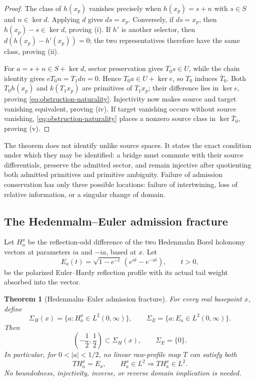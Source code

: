\documentclass[11pt]{article}
\newtheorem{theorem}{Theorem}[section]
\theoremstyle{definition}
\theoremstyle{remark}
\begin{document}
\begin{proof}
The class of \(h(x_p)\) vanishes precisely when
\(h(x_p)=s+n\) with \(s\in S\) and \(n\in\ker d\).  Applying \(d\)
gives \(ds=x_p\).  Conversely, if \(ds=x_p\), then
\(h(x_p)-s\in\ker d\), proving (i).  If \(h'\) is another selector, then
\(d(h(x_p)-h'(x_p))=0\); the two representatives therefore have the same
class, proving (ii).

For \(a=s+n\in S+\ker d\), sector preservation gives
\(T_0s\in U\), while the chain identity gives
\(eT_0n=T_1dn=0\).  Hence \(T_0a\in U+\ker e\), so \(T_0\) induces
\(\overline T_0\).  Both \(T_0h(x_p)\) and \(k(T_1x_p)\) are primitives
of \(T_1x_p\); their difference lies in \(\ker e\), proving
\eqref{eq:obstruction-naturality}.  Injectivity now makes source and target
vanishing equivalent, proving (iv).  If target vanishing occurs without
source vanishing, \eqref{eq:obstruction-naturality} places a nonzero source
class in \(\ker\overline T_0\), proving (v).
\end{proof}

The theorem does not identify unlike source spaces.  It states the exact
condition under which they may be identified: a bridge must commute with
their source differentials, preserve the admitted sector, and remain
injective after quotienting both admitted primitives and primitive
ambiguity.  Failure of admission conservation has only three possible
locations: failure of intertwining, loss of relative information, or a
singular change of domain.

\subsection{The Hedenmalm--Euler admission fracture}

Let \(H_a^x\) be the reflection-odd difference of the two Hedenmalm Borel
holonomy vectors at parameters \(ia\) and \(-ia\), based at \(x\).  Let
\[
 E_a(t)=\sqrt{1-e^{-t}}\,(e^{at}-e^{-at}),\qquad t>0,
\tag{5.G}\label{eq:weighted-euler-profile}
\]
be the polarized Euler--Hardy reflection profile with its actual tail
weight absorbed into the vector.

\begin{theorem}[Hedenmalm--Euler admission fracture]
\label{thm:hedenmalm-euler}
For every real basepoint \(x\), define
\[
 \Sigma_H(x)=\{a:H_a^x\in L^2(0,\infty)\},\qquad
 \Sigma_E=\{a:E_a\in L^2(0,\infty)\}.
\]
Then
\[
 \left(-\frac12,\frac12\right)\subset\Sigma_H(x),
 \qquad \Sigma_E=\{0\}.
\tag{5.H}\label{eq:analytic-spectra}
\]
In particular, for \(0<|a|<1/2\), no linear raw-profile map \(T\) can
satisfy both
\[
                  T H_a^x=E_a,\qquad
                  H_a^x\in L^2\Longrightarrow T H_a^x\in L^2.
\tag{5.I}\label{eq:no-regular-intertwiner}
\]
No boundedness, injectivity, inverse, or reverse domain implication is
needed.
\end{theorem}
\end{document}
